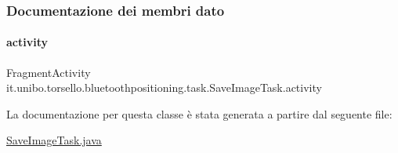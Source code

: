 \subsubsection{Documentazione dei membri dato}
\hypertarget{classit_1_1unibo_1_1torsello_1_1bluetoothpositioning_1_1task_1_1SaveImageTask_a340aca6a2cdcfbf41aed236588669203_a340aca6a2cdcfbf41aed236588669203}{}\label{classit_1_1unibo_1_1torsello_1_1bluetoothpositioning_1_1task_1_1SaveImageTask_a340aca6a2cdcfbf41aed236588669203_a340aca6a2cdcfbf41aed236588669203} 
\paragraph{\texorpdfstring{activity}{activity}}
{\footnotesize\ttfamily Fragment\+Activity it.\+unibo.\+torsello.\+bluetoothpositioning.\+task.\+Save\+Image\+Task.\+activity\hspace{0.3cm}{\ttfamily [private]}}



La documentazione per questa classe è stata generata a partire dal seguente file\+:\begin{DoxyCompactItemize}
\item 
\hyperlink{SaveImageTask_8java}{Save\+Image\+Task.\+java}\end{DoxyCompactItemize}
